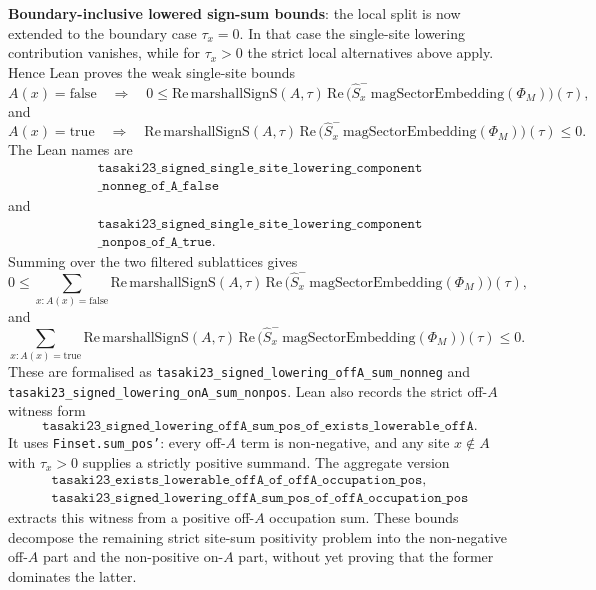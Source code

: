 \documentclass[a4paper,11pt]{article}
\begin{document}
\textbf{Boundary-inclusive lowered sign-sum bounds}: the local split is
now extended to the boundary case \(\tau_x=0\).  In that case the
single-site lowering contribution vanishes, while for \(\tau_x>0\) the
strict local alternatives above apply.  Hence Lean proves the weak
single-site bounds
\[
  A(x)=\mathrm{false}
  \quad\Rightarrow\quad
  0 \le
  \mathrm{Re}\,\mathrm{marshallSignS}(A,\tau)\,
  \mathrm{Re}\,
  \bigl(\hat S^-_x\,\mathrm{magSectorEmbedding}(\Phi_M)\bigr)(\tau),
\]
and
\[
  A(x)=\mathrm{true}
  \quad\Rightarrow\quad
  \mathrm{Re}\,\mathrm{marshallSignS}(A,\tau)\,
  \mathrm{Re}\,
  \bigl(\hat S^-_x\,\mathrm{magSectorEmbedding}(\Phi_M)\bigr)(\tau)
  \le 0 .
\]
The Lean names are
\[
\begin{gathered}
\texttt{tasaki23\_signed\_single\_site\_lowering\_component}\\
\texttt{\_nonneg\_of\_A\_false}
\end{gathered}
\]
and
\[
\begin{gathered}
\texttt{tasaki23\_signed\_single\_site\_lowering\_component}\\
\texttt{\_nonpos\_of\_A\_true}.
\end{gathered}
\]
Summing over the two filtered sublattices gives
\[
  0 \le
  \sum_{x:A(x)=\mathrm{false}}
  \mathrm{Re}\,\mathrm{marshallSignS}(A,\tau)\,
  \mathrm{Re}\,
  \bigl(\hat S^-_x\,\mathrm{magSectorEmbedding}(\Phi_M)\bigr)(\tau),
\]
and
\[
  \sum_{x:A(x)=\mathrm{true}}
  \mathrm{Re}\,\mathrm{marshallSignS}(A,\tau)\,
  \mathrm{Re}\,
  \bigl(\hat S^-_x\,\mathrm{magSectorEmbedding}(\Phi_M)\bigr)(\tau)
  \le 0 .
\]
These are formalised as
\texttt{tasaki23\_signed\_lowering\_offA\_sum\_nonneg} and
\texttt{tasaki23\_signed\_lowering\_onA\_sum\_nonpos}.  Lean also
records the strict off-\(A\) witness form
\[
\texttt{tasaki23\_signed\_lowering\_offA\_sum\_pos\_of\_exists\_lowerable\_offA}.
\]
It uses \texttt{Finset.sum\_pos'}: every off-\(A\) term is
non-negative, and any site \(x\notin A\) with \(\tau_x>0\) supplies a
strictly positive summand.  The aggregate version
\[
\begin{gathered}
\texttt{tasaki23\_exists\_lowerable\_offA\_of\_offA\_occupation\_pos},\\
\texttt{tasaki23\_signed\_lowering\_offA\_sum\_pos\_of\_offA\_occupation\_pos}
\end{gathered}
\]
extracts this witness from a positive off-\(A\) occupation sum.  These
bounds decompose the remaining strict site-sum positivity problem into
the non-negative off-\(A\) part and the non-positive on-\(A\) part,
without yet proving that the former
dominates the latter.
\end{document}
